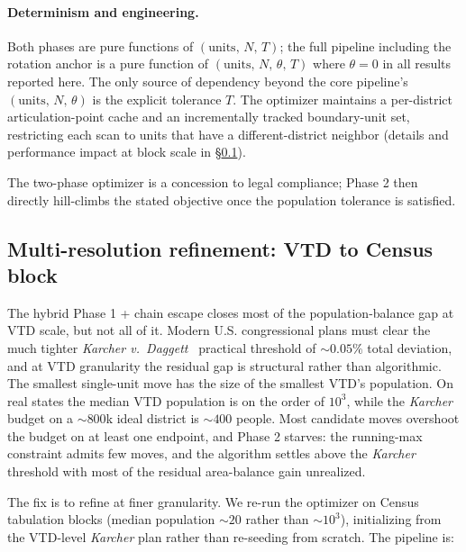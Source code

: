 \paragraph{Determinism and engineering.}
Both phases are pure functions of $(\mathrm{units},\,N,\,T)$; the full
pipeline including the rotation anchor is a pure function of
$(\mathrm{units},\,N,\,\theta,\,T)$ where $\theta = 0$ in all
results reported here. The only source of dependency beyond the core
pipeline's $(\mathrm{units},\,N,\,\theta)$ is the explicit tolerance $T$. The optimizer maintains a per-district articulation-point cache and
an incrementally tracked boundary-unit set, restricting each scan to
units that have a different-district neighbor (details and performance
impact at block scale in \S\ref{sec:methods-block}).

The two-phase optimizer is a concession to legal compliance; Phase 2
then directly hill-climbs the stated objective once the population
tolerance is satisfied.

\subsection{Multi-resolution refinement: VTD to Census block}
\label{sec:methods-block}

The hybrid Phase 1 + chain escape closes most of the population-balance
gap at VTD scale, but not all of it. Modern U.S. congressional plans
must clear the much tighter \textit{Karcher v.~Daggett}~\cite{karcher1983}
practical threshold of $\sim 0.05\%$ total deviation, and at VTD
granularity the residual gap is structural rather than
algorithmic. The smallest single-unit move has the size of the
smallest VTD's population. On real states the median VTD population
is on the order of $10^3$, while the \textit{Karcher} budget on a $\sim 800$k
ideal district is $\sim 400$ people. Most candidate moves overshoot
the budget on at least one endpoint, and Phase 2 starves: the
running-max constraint admits few moves, and the algorithm settles
above the \textit{Karcher} threshold with most of the residual
area-balance gain unrealized.

The fix is to refine at finer granularity. We re-run the optimizer
on Census tabulation blocks (median population $\sim 20$ rather
than $\sim 10^3$), initializing from the VTD-level \textit{Karcher}
plan rather than re-seeding from scratch. The pipeline is:

